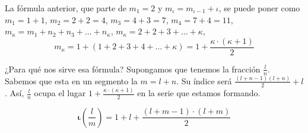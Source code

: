 \documentclass{amsart}
\theoremstyle{definition}
\theoremstyle{remark}
\numberwithin{equation}{section}
\newcommand{\monrel}[1]{\mathbf{#1}}
\newcommand{\funct}[1]{\monrel{#1}}
\newcommand{\functat}[2]{\funct{#1}{\left({#2}\right)}}
\begin{document}
	La fórmula anterior, que parte de $m_1 = 2$ y $m_{\iota} = m_{\iota - 1}
+ \iota$, se puede poner como $m_1 = 1 + 1$, $m_2 = 2 + 2 = 4$, $m_3 = 4 + 3
= 7$, $m_4 = 7 + 4 = 11$, $m_{\kappa} = m_1 + n_2 + n_3 + \ldots +
n_{\kappa}$, $m_{\kappa} = 2 + 2 + 3 + \ldots + \kappa$,
$$
m_{\kappa} = 1 + (1 + 2 + 3 + 4 + \ldots + \kappa) = 1 + \frac{\kappa \cdot
\left({\kappa + 1}\right)}{2}
$$


	¿Para qué nos sirve esa fórmula? Supongamos que tenemos la fracción
$\frac{l}{n}$. Sabemos que esta en un segmento la $m = l + n$. Su índice será
$\frac{(l+n-1)(l+n)}{2}+l$. Así, $\frac{l}{n}$ ocupa el lugar $1 +
\frac{\kappa \cdot \left({\kappa + 1}\right)}{2}$ en la serie que estamos
formando.

$$
\functat{\iota}{\frac{l}{m}} = {1 + l + \frac{\left(l+m-1\right)
\cdot \left(l+m\right)}{2}}
$$











\end{document}
